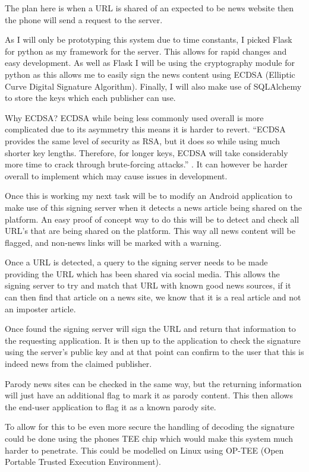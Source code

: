 \documentclass[11pt,a4paper]{report}
\begin{document}
The plan here is when a URL is shared of an expected to be news website then the phone will send a request to the server.

As I will only be prototyping this system due to time constants, I picked Flask for python as my framework for the server. This allows for rapid changes and easy development. As well as Flask I will be using the cryptography module for python as this allows me to easily sign the news content using ECDSA (Elliptic Curve Digital Signature Algorithm). Finally, I will also make use of SQLAlchemy to store the keys which each publisher can use.

Why ECDSA? ECDSA while being less commonly used overall is more complicated due to its asymmetry this means it is harder to revert. “ECDSA provides the same level of security as RSA, but it does so while using much shorter key lengths. Therefore, for longer keys, ECDSA will take considerably more time to crack through brute-forcing attacks.” \citep{RSA}. It can however be harder overall to implement which may cause issues in development.

Once this is working my next task will be to modify an Android application to make use of this signing server when it detects a news article being shared on the platform. An easy proof of concept way to do this will be to detect and check all URL’s that are being shared on the platform. This way all news content will be flagged, and non-news links will be marked with a warning.

Once a URL is detected, a query to the signing server needs to be made providing the URL which has been shared via social media. This allows the signing server to try and match that URL with known good news sources, if it can then find that article on a news site, we know that it is a real article and not an imposter article.

Once found the signing server will sign the URL and return that information to the requesting application. It is then up to the application to check the signature using the server’s public key and at that point can confirm to the user that this is indeed news from the claimed publisher.

Parody news sites can be checked in the same way, but the returning information will just have an additional flag to mark it as parody content. This then allows the end-user application to flag it as a known parody site.

To allow for this to be even more secure the handling of decoding the signature could be done using the phones TEE chip which would make this system much harder to penetrate. This could be modelled on Linux using OP-TEE (Open Portable Trusted Execution Environment).
\end{document}
